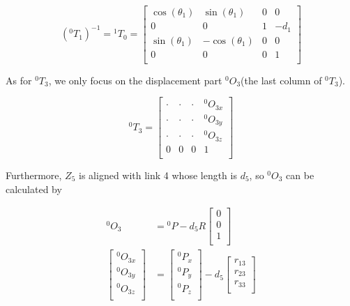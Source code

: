 \documentclass{article}
\renewcommand{\c}[1]{\cos(\theta_{#1})}
\newcommand{\s}[1]{\sin(\theta_{#1})}
\newcommand{\T}[2]{{}^{#1}T_{#2}}
\renewcommand{\O}[2]{{}^{#1}O_{#2}}
\begin{document}
\begin{equation}
\label{eq:inverse.t_10}
{(\T{0}{1})}^{-1} = \T{1}{0} = \left[
\begin{array}{cccc}
	\c{1} & \s{1} & 0 & 0 \\
	0 & 0 & 1 & -d_1 \\
	\s{1} & -\c{1} & 0 & 0 \\
	0 & 0 & 0 & 1 \\
\end{array}
\right]
\end{equation}

As for  $\T{0}{3}$, we only focus on the displacement part $\O{0}{3}$(the last column of $\T{0}{3}$).

\begin{equation}
\label{eq:inverse.t_03}
\T{0}{3} = \left[ \begin{array}{cccc}
	\cdot & \cdot & \cdot & {}^0O_{3x} \\
	\cdot & \cdot & \cdot & {}^0O_{3y} \\
	\cdot & \cdot & \cdot & {}^0O_{3z} \\
	0 & 0 & 0 & 1 \\
\end{array} \right]
\end{equation}

Furthermore, $Z_5$ is aligned with link 4 whose length is $d_5$, so $\O{0}{3}$ can be calculated by

\begin{equation}
\label{eq:inverse.O_03}
\begin{aligned}
\O{0}{3} & = {}^0P - d_5 R\left[
\begin{array}{c}
	0 \\
	0 \\
	1 \\
\end{array} \right]  \\
\left[
\begin{array}{c}
	{}^0O_{3x} \\
	{}^0O_{3y} \\
	{}^0O_{3z} \\
\end{array} \right] & = \left[
\begin{array}{c}
	{}^0P_x \\
	{}^0P_y \\
	{}^0P_z \\
\end{array}
\right] - d_5 \left[ \begin{array}{c}
	{}r_{13} \\
	{}r_{23} \\
	{}r_{33} \\
\end{array} \right]
\end{aligned}
\end{equation}
\end{document}

